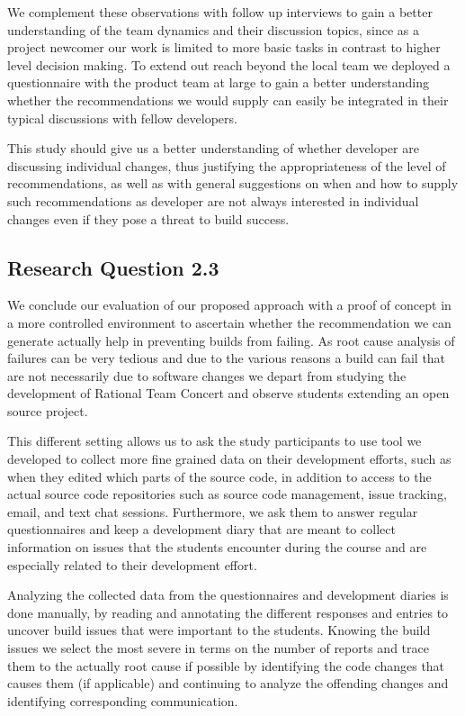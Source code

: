We complement these observations with follow up interviews to gain a better understanding of the team dynamics and their discussion topics, since as a project newcomer our work is limited to more basic tasks in contrast to higher level decision making.
To extend out reach beyond the local team we deployed a questionnaire with the product team at large to gain a better understanding whether the recommendations we would supply can easily be integrated in their typical discussions with fellow developers.

This study should give us a better understanding of whether developer are discussing individual changes, thus justifying the appropriateness of the level of recommendations, as well as with general suggestions on when and how to supply such recommendations as developer are not always interested in individual changes even if they pose a threat to build success.

\subsection{Research Question 2.3}
We conclude our evaluation of our proposed approach with  a proof of concept in a more controlled environment to ascertain whether the recommendation we can generate actually help in preventing builds from failing.
As root cause analysis of failures can be very tedious and due to the various reasons a build can fail that are not necessarily due to software changes we depart from studying the development of Rational Team Concert and observe students extending an open source project.

This different setting allows us to ask the study participants to use tool we developed to collect more fine grained data on their development efforts, such as when they edited which parts of the source code, in addition to access to the actual source code repositories such as source code management, issue tracking, email, and text chat sessions.
Furthermore, we ask them to answer regular questionnaires and keep a development diary that are meant to collect information on issues that the students encounter during the course and are especially related to their development effort.

Analyzing the collected data from the questionnaires and development diaries is done manually, by reading and annotating the different responses and entries to uncover build issues that were important to the students.
Knowing the build issues we select the most severe in terms on the number of reports and trace them to the actually root cause if possible by identifying the code changes that causes them (if applicable) and continuing to analyze the offending changes and identifying corresponding communication.

